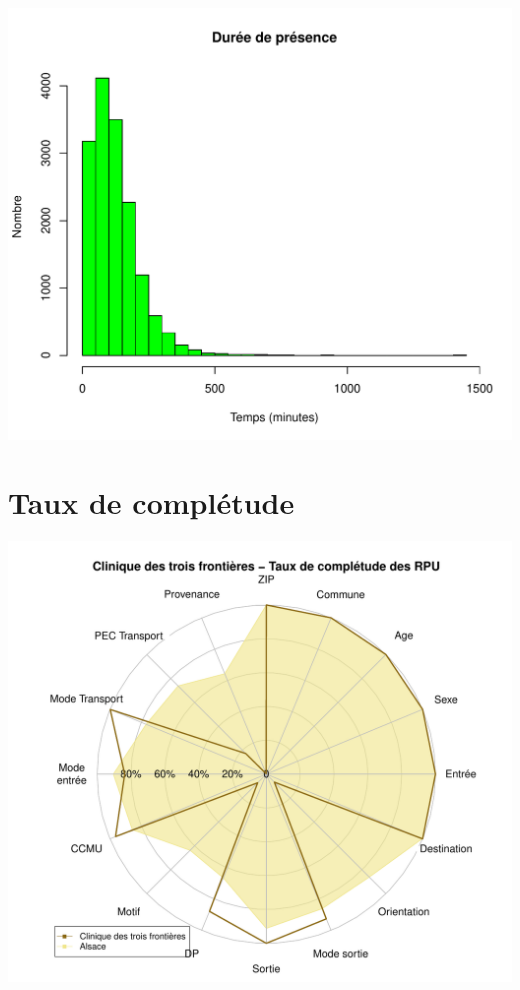 \documentclass[12pt,english,french,twoside]{book}\usepackage[]{graphicx}\usepackage[]{color}
\makeatletter
\def\maxwidth{ %
  \ifdim\Gin@nat@width>\linewidth
    \linewidth
  \else
    \Gin@nat@width
  \fi
}
\newenvironment{knitrout}{}{} %
\makeatother
\begin{document}
\begin{knitrout}
\color{fgcolor}
\includegraphics[width=\maxwidth]{figure/graphe_3fr-1} 

\end{knitrout}

\section*{Taux de complétude}

\begin{knitrout}
\color{fgcolor}
\includegraphics[width=\maxwidth]{figure/compl_3fr-1} 

\end{knitrout}
\end{document}
